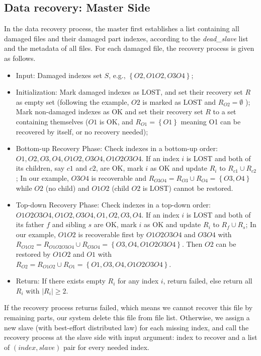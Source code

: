 \documentclass[conference]{IEEEtran}
\begin{document}
\subsection{Data recovery: Master Side}
In the data recovery process, the master first establishes a list containing all damaged files and their damaged part indexes, according to the \textit{dead\_slave} list and the metadata of all files. For each damaged file, the recovery process is given as follows.
\begin{itemize}
\item Input: Damaged indexes set $S$, e.g., $\left\{O2, O1O2, O3O4\right\}$;
\item Initialization: Mark damaged indexes as LOST, and set their recovery set $R$ as empty set (following the example, $O2$ is marked as LOST and $R_{O2} = \emptyset$ ); Mark non-damaged indexes as OK and set their recovery set $R$ to a set containing themselves ($O1$ is OK, and $R_{O1} = \left\{O1\right\}$ meaning O1 can be recovered by itself, or no recovery needed);
\item Bottom-up Recovery Phase: Check indexes in a bottom-up order: $O1, O2, O3, O4, O1O2, O3O4, O1O2O3O4$. If an index $i$ is LOST and both of its children, say $c1$ and $c2$, are OK, mark $i$ as OK and update $R_{i}$ to $R_{c1}\cup R_{c2}$; In our example, $O3O4$ is recoverable and $R_{O3O4} = R_{O3}\cup R_{O4} = \left\{O3, O4\right\}$ while $O2$ (no child) and $O1O2$ (child $O2$ is LOST) cannot be restored.
\item Top-down Recovery Phase: Check indexes in a top-down order: $O1O2O3O4, O1O2, O3O4, O1, O2, O3, O4$. If an index $i$ is LOST and both of its father $f$ and sibling $s$ are OK, mark $i$ as OK and update $R_{i}$ to $R_{f}\cup R_{s}$; In our example, $O1O2$ is recoverable first by $O1O2O3O4$ and $O3O4$ with $R_{O1O2} = R_{O1O2O3O4}\cup R_{O3O4} = \left\{O3, O4, O1O2O3O4\right\}$. Then $O2$ can be restored by $O1O2$ and $O1$ with $R_{O2} = R_{O1O2}\cup R_{O1} = \left\{O1, O3, O4, O1O2O3O4\right\}$.
\item Return: If there exists empty $R_i$ for any index $i$, return failed, else return all $R_i$ with $|R_i|\ge2$.
\end{itemize}

If the recovery process returns failed, which means we cannot recover this file by remaining parts, our system delete this file from file list. Otherwise, we assign a new slave (with best-effort distributed law) for each missing index, and call the recovery process at the slave side with input argument: index to recover and a list of $(index, slave)$ pair for every needed index.
\end{document}
